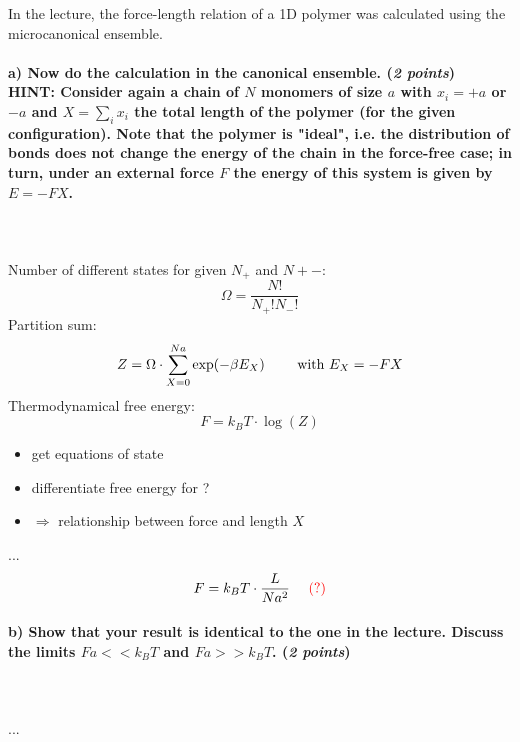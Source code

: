 In the lecture, the force-length relation of a 1D polymer was calculated
using the microcanonical ensemble.

\paragraph{a) Now do the calculation in the canonical ensemble.
    (\textit{2 points}) \\
    HINT: Consider again a chain of $N$ monomers of size $a$ with $x_i=+a$ or 
    $-a$ and $X=\sum_ix_i$ the total length of the polymer (for the given 
    configuration). Note that the polymer is "ideal", i.e. the distribution of 
    bonds does not change the energy of the chain in the force-free case;
    in turn, under an external force $F$ the energy of this system is given by 
    $E=-FX$.
} \ \\
    \\
    Number of different states for given $N_+$ and $N+-$:
    \begin{equation}
        \Omega=\frac{N!}{N_+!N_-!}
    \end{equation}
    Partition sum:
    \begin{equation}
        Z=\Omega\cdot\sum_{X=0}^{Na}\exp(-\beta E_X)
        \ \ \ \ \ \ \ \textnormal{with }
        E_X=-FX
    \end{equation}
    Thermodynamical free energy:
    \begin{equation}
        F=k_BT\cdot\log(Z)
    \end{equation}
    \begin{itemize}
        \item get equations of state
        \item differentiate free energy for ?
        \item $\Rightarrow$ relationship between force and length $X$
    \end{itemize}
    ...
    \begin{equation}
        F=k_BT\cdot\frac{L}{Na^2} \textcolor{red}{\ \ \ \ (?)}
    \end{equation}

\paragraph{b) Show that your result is identical to the one in the lecture.
    Discuss the limits $Fa<<k_BT$ and $Fa>>k_BT$. (\textit{2 points})
} \ \\
    \\
    ...

